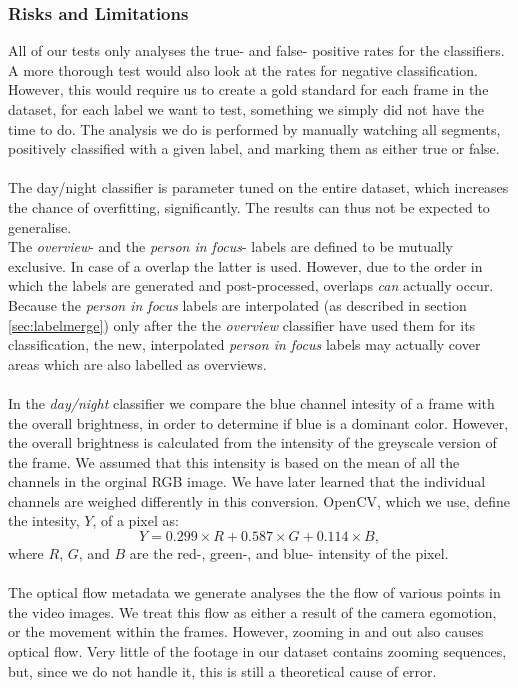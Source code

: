 \subsubsection{Risks and Limitations}
%
All of our tests only analyses the true- and false- positive rates for the classifiers. A more thorough test would also look at the rates for negative classification. However, this would require us to create a gold standard for each frame in the dataset, for each label we want to test, something we simply did not have the time to do. The analysis we do is performed by manually watching all segments, positively classified with a given label, and marking them as either true or false.\\
\\
The day/night classifier is parameter tuned on the entire dataset, which increases the chance of overfitting, significantly. The results can thus not be expected to generalise.
\\
The \textit{overview}- and the \textit{person in focus}- labels are defined to be mutually exclusive. In case of a overlap the latter is used. However, due to the order in which the labels are generated and post-processed, overlaps \textit{can} actually occur. Because the \textit{person in focus} labels are interpolated (as described in section \ref{sec:labelmerge}) only after the the \textit{overview} classifier have used them for its classification, the new, interpolated \textit{person in focus} labels may actually cover areas which are also labelled as overviews.\\
\\
In the \textit{day/night} classifier we compare the blue channel intesity of a frame with the overall brightness, in order to determine if blue is a dominant color. However, the overall brightness is calculated from the intensity of the greyscale version of the frame. We assumed that this intensity is based on the mean of all the channels in the orginal RGB image. We have later learned that the individual channels are weighed differently in this conversion. OpenCV, which we use, define the intesity, $Y$, of a pixel as:
%
\[
Y = 0.299 \times R + 0.587 \times  G + 0.114 \times B,
\]
%
where $R$, $G$, and $B$ are the red-, green-, and blue- intensity of the pixel.\\
\\
The optical flow metadata we generate analyses the the flow of various points in the video images. We treat this flow as either a result of the camera egomotion, or the movement within the frames. However, zooming in and out also causes optical flow. Very little of the footage in our dataset contains zooming sequences, but, since we do not handle it, this is still a theoretical cause of error.
%
